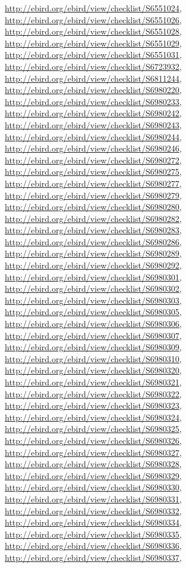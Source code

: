 \documentclass[9pt, article]{memoir}
\begin{document}
\begin{multicols}{2}
\url{http://ebird.org/ebird/view/checklist/S6551024}, 
\url{http://ebird.org/ebird/view/checklist/S6551026}, 
\url{http://ebird.org/ebird/view/checklist/S6551028}, 
\url{http://ebird.org/ebird/view/checklist/S6551029}, 
\url{http://ebird.org/ebird/view/checklist/S6551031}, 
\url{http://ebird.org/ebird/view/checklist/S6723932}, 
\url{http://ebird.org/ebird/view/checklist/S6811244}, 
\url{http://ebird.org/ebird/view/checklist/S6980220}, 
\url{http://ebird.org/ebird/view/checklist/S6980233}, 
\url{http://ebird.org/ebird/view/checklist/S6980242}, 
\url{http://ebird.org/ebird/view/checklist/S6980243}, 
\url{http://ebird.org/ebird/view/checklist/S6980244}, 
\url{http://ebird.org/ebird/view/checklist/S6980246}, 
\url{http://ebird.org/ebird/view/checklist/S6980272}, 
\url{http://ebird.org/ebird/view/checklist/S6980275}, 
\url{http://ebird.org/ebird/view/checklist/S6980277}, 
\url{http://ebird.org/ebird/view/checklist/S6980279}, 
\url{http://ebird.org/ebird/view/checklist/S6980280}, 
\url{http://ebird.org/ebird/view/checklist/S6980282}, 
\url{http://ebird.org/ebird/view/checklist/S6980283}, 
\url{http://ebird.org/ebird/view/checklist/S6980286}, 
\url{http://ebird.org/ebird/view/checklist/S6980289}, 
\url{http://ebird.org/ebird/view/checklist/S6980292}, 
\url{http://ebird.org/ebird/view/checklist/S6980301}, 
\url{http://ebird.org/ebird/view/checklist/S6980302}, 
\url{http://ebird.org/ebird/view/checklist/S6980303}, 
\url{http://ebird.org/ebird/view/checklist/S6980305}, 
\url{http://ebird.org/ebird/view/checklist/S6980306}, 
\url{http://ebird.org/ebird/view/checklist/S6980307}, 
\url{http://ebird.org/ebird/view/checklist/S6980309}, 
\url{http://ebird.org/ebird/view/checklist/S6980310}, 
\url{http://ebird.org/ebird/view/checklist/S6980320}, 
\url{http://ebird.org/ebird/view/checklist/S6980321}, 
\url{http://ebird.org/ebird/view/checklist/S6980322}, 
\url{http://ebird.org/ebird/view/checklist/S6980323}, 
\url{http://ebird.org/ebird/view/checklist/S6980324}, 
\url{http://ebird.org/ebird/view/checklist/S6980325}, 
\url{http://ebird.org/ebird/view/checklist/S6980326}, 
\url{http://ebird.org/ebird/view/checklist/S6980327}, 
\url{http://ebird.org/ebird/view/checklist/S6980328}, 
\url{http://ebird.org/ebird/view/checklist/S6980329}, 
\url{http://ebird.org/ebird/view/checklist/S6980330}, 
\url{http://ebird.org/ebird/view/checklist/S6980331}, 
\url{http://ebird.org/ebird/view/checklist/S6980332}, 
\url{http://ebird.org/ebird/view/checklist/S6980334}, 
\url{http://ebird.org/ebird/view/checklist/S6980335}, 
\url{http://ebird.org/ebird/view/checklist/S6980336}, 
\url{http://ebird.org/ebird/view/checklist/S6980337}, 

\end{multicols}
\end{document}
